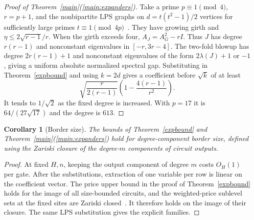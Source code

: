 \documentclass[11pt]{article}
\newtheorem{corollary}[theorem]{Corollary}
\theoremstyle{remark}
\begin{document}
\begin{proof}[Proof of Theorem~\ref{main}(\ref{main:expanders})]
Take a prime $p\equiv1\pmod4$, $r=p+1$, and the nonbipartite LPS graphs on $d=t(t^2-1)/2$ vertices for sufficiently large primes $t\equiv1\pmod{4p}$~\cite{lps}. They have growing girth and $\eta\le2\sqrt{r-1}/r$. When the girth exceeds four, $A_J=A_G^2-rI$. Thus $J$ has degree $r(r-1)$ and nonconstant eigenvalues in $[-r,3r-4]$. The two-fold blowup has degree $2r(r-1)+1$ and nonconstant eigenvalues of the form $2\lambda(J)+1$ or $-1$, giving a uniform absolute normalized spectral gap. Substituting in Theorem~\ref{expbound} and using $k=2d$ gives a coefficient before $\sqrt k$ of at least
\[
 \sqrt{\frac{r}{2(r-1)}}\left(1-\frac{4(r-1)}{r^2}\right).
\]
It tends to $1/\sqrt2$ as the fixed degree is increased. With $p=17$ it is $64/(27\sqrt{17})$ and the degree is $613$.
\end{proof}

\begin{corollary}[Border size]\label{border}
The bounds of Theorem~\ref{expbound} and Theorem~\ref{main}(\ref{main:expanders}) hold for degree-component border size, defined using the Zariski closure of the degree-$m$ components of circuit outputs.
\end{corollary}
\begin{proof}
At fixed $H,n$, keeping the output component of degree $m$ costs $O_H(1)$ per gate. After the substitutions, extraction of one variable per row is linear on the coefficient vector. The price upper bound in the proof of Theorem~\ref{expbound} holds for the image of all size-bounded circuits, and the weighted-price sublevel sets at the fixed sites are Zariski closed~\cite{circuits}. It therefore holds on the image of their closure. The same LPS substitution gives the explicit families.
\end{proof}
\end{document}
